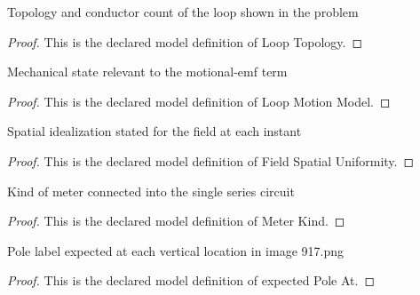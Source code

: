 \begin{definition}
  \label{def:physics:phyx-mini-0917:phyxminiproblems-problemphyxmini0917-looptopology}
  Topology and conductor count of the loop shown in the problem
\end{definition}
\begin{proof}
  This is the declared model definition of Loop Topology.
\end{proof}
\begin{definition}
  \label{def:physics:phyx-mini-0917:phyxminiproblems-problemphyxmini0917-loopmotionmodel}
  Mechanical state relevant to the motional-emf term
\end{definition}
\begin{proof}
  This is the declared model definition of Loop Motion Model.
\end{proof}
\begin{definition}
  \label{def:physics:phyx-mini-0917:phyxminiproblems-problemphyxmini0917-fieldspatialuniformity}
  Spatial idealization stated for the field at each instant
\end{definition}
\begin{proof}
  This is the declared model definition of Field Spatial Uniformity.
\end{proof}
\begin{definition}
  \label{def:physics:phyx-mini-0917:phyxminiproblems-problemphyxmini0917-meterkind}
  Kind of meter connected into the single series circuit
\end{definition}
\begin{proof}
  This is the declared model definition of Meter Kind.
\end{proof}
\begin{definition}
  \label{def:physics:phyx-mini-0917:phyxminiproblems-problemphyxmini0917-expectedpoleat}
  Pole label expected at each vertical location in image 917.png
\end{definition}
\begin{proof}
  This is the declared model definition of expected Pole At.
\end{proof}

